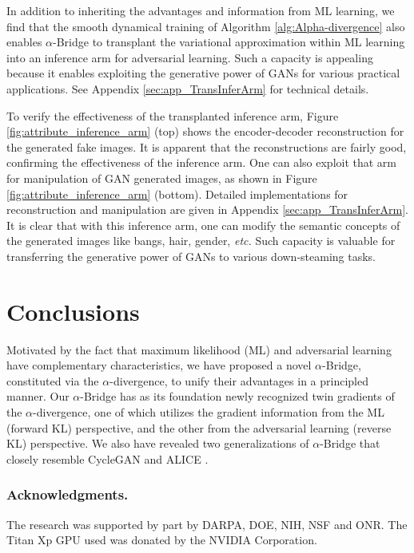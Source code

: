 \documentclass[letterpaper]{article} %
\newcommand{\etc}[0]{\emph{etc. }}
\begin{document}
In addition to inheriting the advantages and information from ML learning, we find that the smooth dynamical training of Algorithm \ref{alg:Alpha-divergence} also enables $\alpha$-Bridge to transplant the variational approximation within ML learning into an inference arm for adversarial learning. Such a capacity is  appealing because it enables exploiting the generative power of GANs for various practical applications. 
See 
Appendix \ref{sec:app_TransInferArm} 
for technical details.


To verify the effectiveness of the transplanted inference arm, Figure \ref{fig:attribute_inference_arm} (top) shows the encoder-decoder reconstruction for the generated fake images. It is apparent that the reconstructions are fairly good, confirming the effectiveness of the inference arm.
One can also exploit that arm for manipulation of GAN generated images, as shown in Figure \ref{fig:attribute_inference_arm} (bottom). Detailed implementations for reconstruction and manipulation are given in 
Appendix \ref{sec:app_TransInferArm}. 
It is clear that with this inference arm, one can modify the semantic concepts of the generated images like bangs, hair, gender, \etc Such capacity is valuable for transferring the generative power of GANs to various down-steaming tasks.



\section{Conclusions}


Motivated by the fact that maximum likelihood (ML) and adversarial learning have complementary characteristics, we have proposed a novel $\alpha$-Bridge, constituted via the $\alpha$-divergence, to unify their advantages in a principled manner. 
Our $\alpha$-Bridge has as its foundation newly recognized twin gradients of the $\alpha$-divergence, one of which utilizes the gradient information from the ML (forward KL) perspective, and the other from the adversarial learning (reverse KL) perspective.
We also have revealed two generalizations of $\alpha$-Bridge
that closely resemble CycleGAN \cite{zhu2017unpaired} and ALICE \cite{li2017alice}.


\subsubsection{Acknowledgments.} The research was supported by part by DARPA, DOE, NIH, NSF and ONR. The Titan Xp GPU used was donated by the NVIDIA Corporation. 
\end{document}
